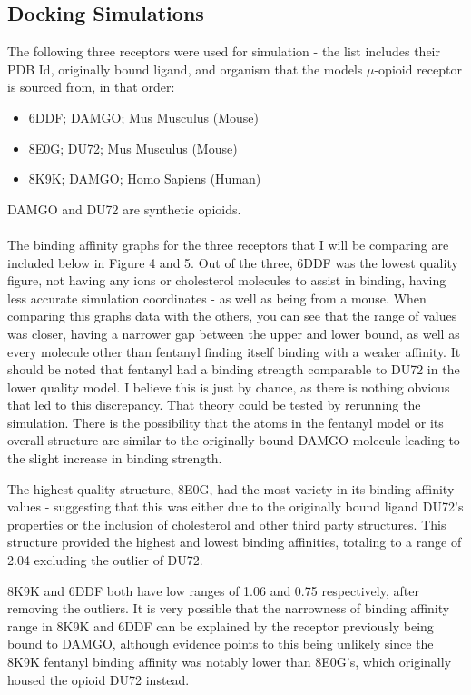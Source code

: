 \documentclass[a4paper,10pt]{article}
\begin{document}
\subsection{Docking Simulations}
The following three receptors were used for simulation - the list includes their PDB Id, originally bound ligand, and organism that the models $\mu$-opioid receptor is sourced from, in that order:
\begin{itemize}
    \item 6DDF; DAMGO; Mus Musculus (Mouse)
    \item 8E0G; DU72; Mus Musculus (Mouse)
    \item 8K9K; DAMGO; Homo Sapiens (Human)
\end{itemize}
    DAMGO and DU72 are synthetic opioids.\\
    \\
The binding affinity graphs for the three receptors that I will be comparing are included below in Figure 4 and 5. 
Out of the three, 6DDF was the lowest quality figure, not having any ions or cholesterol molecules to assist in binding, having less accurate simulation coordinates - as well as being from a mouse. When comparing this graphs data with the others, you can see that the range of values was closer, having a narrower gap between the upper and lower bound, as well as every molecule other than fentanyl finding itself binding with a weaker affinity. It should be noted that fentanyl had a binding strength comparable to DU72 in the lower quality model. I believe this is just by chance, as there is nothing obvious that led to this discrepancy. That theory could be tested by rerunning the simulation. There is the possibility that the atoms in the fentanyl model or its overall structure are similar to the originally bound DAMGO molecule leading to the slight increase in binding strength.

The highest quality structure, 8E0G, had the most variety in its binding affinity values - suggesting that this was either due to the originally bound ligand DU72's properties or the inclusion of cholesterol and other third party structures. This structure provided the highest and lowest binding affinities, totaling to a range of 2.04 excluding the outlier of DU72. 

8K9K and 6DDF both have low ranges of 1.06 and 0.75 respectively, after removing the outliers.
It is very possible that the narrowness of binding affinity range in 8K9K and 6DDF can be explained by the receptor previously being bound to DAMGO, although evidence points to this being unlikely since the 8K9K fentanyl binding affinity was notably lower than 8E0G's, which originally housed the opioid DU72 instead.
\end{document}
